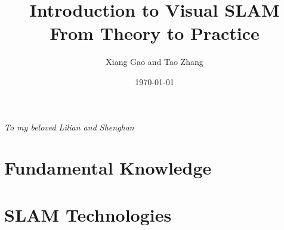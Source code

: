 \documentclass[a4paper,9pt,openleft]{book}
\begin{document}
\title{Introduction to Visual SLAM\\From Theory to Practice}
\author{Xiang Gao and Tao Zhang}
\date{\today}

\frontmatter
\maketitle


\clearpage
\begin{center}
	\thispagestyle{empty}
	\vspace*{\fill}
	\Large \emph{To my beloved Lilian and Shenghan}
	\vspace*{\fill}
\end{center}



%


\tableofcontents



\mainmatter 
{}
\hypersetup{bookmarksdepth=2}

\part{Fundamental  Knowledge}






\part{SLAM Technologies}









\appendix
{}
\hypersetup{bookmarksdepth=2}




\backmatter
\small


\newpage
\end{document}
